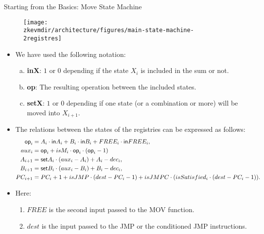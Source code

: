 \begin{frame}[allowframebreaks]{Starting from the Basics: Move State Machine}
\vspace{-0.3cm}
\begin{figure}
	\texttt{[image: \\zkevmdir/architecture/figures/main-state-machine-2registres]}
\end{figure}

\begin{itemize}
\item We have used the following notation:
\begin{enumerate}[a)]
\item \textbf{inX}: $1$ or $0$ depending if the state $X_i$ is included in the sum or not.

\item \textbf{op}: The resulting operation between the included states.

\item \textbf{setX}: $1$ or $0$ depending if one state (or a combination or more) will be moved into $X_{i+1}$.
\end{enumerate}
 
\item The relations between the states of the registries can be expressed as follows:
\begin{align*}
\op_i &= A_i \cdot \inp A_i + B_i \cdot \inp B_i + FREE_i \cdot \inp FREE_i, \\
aux_i &= \op_i +  isM_i \cdot \op_i \cdot (\op_i - 1) \\
A_{i+1} &= \set A_i \cdot (aux_i - A_i) %
+ A_i - dec_i, \\
B_{i+1} &= \set B_i \cdot (aux_i - B_i) %
+ B_i - dec_i, \\
PC_{i+1} &= PC_i + 1 + isJMP \cdot (dest - PC_i - 1) + isJMPC \cdot (isSatisfied_i \cdot (dest - PC_i - 1)).
\end{align*}

\item Here:
\begin{enumerate}
\item $FREE$ is the second input passed to the MOV function.

\item $dest$ is the input passed to the JMP or the conditioned JMP instructions.
\end{enumerate}
\end{itemize}
\end{frame}








